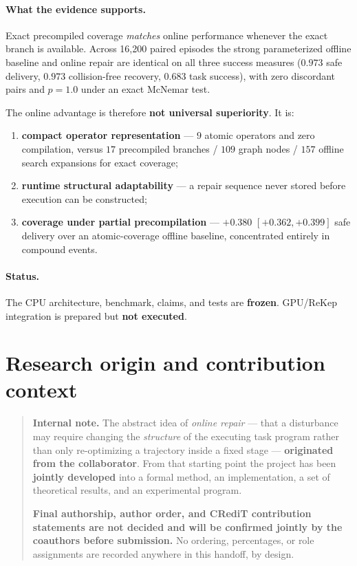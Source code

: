 \documentclass[11pt]{article}
\begin{document}
\paragraph{What the evidence supports.}
Exact precompiled coverage \emph{matches} online performance whenever the exact
branch is available. Across 16{,}200 paired episodes the strong parameterized
offline baseline and online repair are identical on all three success
measures ($0.973$ safe delivery, $0.973$ collision-free recovery, $0.683$ task
success), with zero discordant pairs and $p=1.0$ under an exact McNemar test.

The online advantage is therefore \textbf{not universal superiority}. It is:
\begin{enumerate}[leftmargin=2em,itemsep=1pt]
  \item \textbf{compact operator representation} --- $9$ atomic operators and
        zero compilation, versus $17$ precompiled branches / $109$ graph nodes /
        $157$ offline search expansions for exact coverage;
  \item \textbf{runtime structural adaptability} --- a repair sequence never
        stored before execution can be constructed;
  \item \textbf{coverage under partial precompilation} --- $+0.380$
        $[+0.362,+0.399]$ safe delivery over an atomic-coverage offline
        baseline, concentrated entirely in compound events.
\end{enumerate}

\paragraph{Status.} The CPU architecture, benchmark, claims, and tests are
\textbf{frozen}. GPU/ReKep integration is prepared but \textbf{not executed}.

\section{Research origin and contribution context}

\begin{quote}
\textbf{Internal note.} The abstract idea of \emph{online repair} --- that a
disturbance may require changing the \emph{structure} of the executing task
program rather than only re-optimizing a trajectory inside a fixed stage ---
\textbf{originated from the collaborator}. From that starting point the project
has been \textbf{jointly developed} into a formal method, an implementation, a
set of theoretical results, and an experimental program.

\textbf{Final authorship, author order, and CRediT contribution statements are
not decided and will be confirmed jointly by the coauthors before submission.}
No ordering, percentages, or role assignments are recorded anywhere in this
handoff, by design.
\end{quote}
\end{document}
